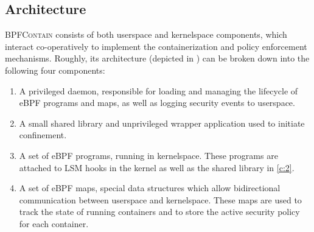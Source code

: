 \documentclass[dvipsnames, 12pt]{article}
\def\bpfcontain{\textsc{BPFContain}}
\begin{document}

\subsection{Architecture}

\bpfcontain{} consists of both userspace and kernelspace components, which
interact co-operatively to implement the containerization and policy enforcement
mechanisms. Roughly, its architecture (depicted in ) can
be broken down into the following four components:
\begin{enumerate}[label=\bfseries C\arabic*., ref=C\arabic*, labelindent=1em]

  \item \label{c:1}
  A privileged daemon, responsible for loading and managing the lifecycle of
  eBPF programs and maps, as well as logging security events to userspace.

  \item \label{c:2}
  A small shared library and unprivileged wrapper application used to initiate
  confinement.

  \item \label{c:3}
  A set of eBPF programs, running in kernelspace. These programs are attached to
  LSM hooks in the kernel as well as the shared library in \ref{c:2}.

  \item \label{c:4}
  A set of eBPF maps, special data structures which allow bidirectional
  communication between userspace and kernelspace. These maps are used to track
  the state of running containers and to store the active security policy for
  each container.
\end{enumerate}
\end{document}
